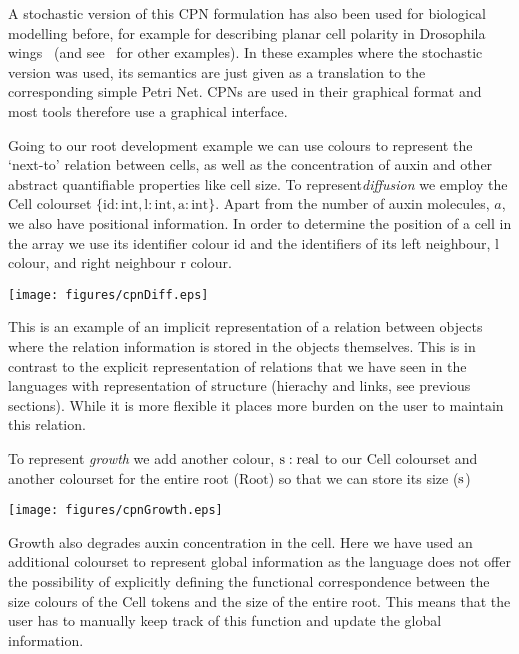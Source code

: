 \documentclass[phd]{infthesis}
\newcommand{\mr}[1]{\mathrm{#1}}
\begin{document}
A stochastic version of this CPN formulation has also been used for biological
modelling before, for example for describing planar cell polarity in Drosophila
wings~\citep{gao_multiscale_2013} (and see~\citet{runge_application_2004,
gilbert_colouring_2013} for other examples). In these examples where the
stochastic version was used, its semantics are just given as a translation to
the corresponding simple Petri Net. CPNs are used in their graphical format and
most tools therefore use a graphical interface.

Going to our root development example we can use colours to represent the
`next-to' relation between cells, as well as the concentration of auxin and
other abstract quantifiable properties like cell size. To represent\emph{diffusion} we
employ the $\mr{Cell}$ colourset $\{\mr{id}: \mr{int}, \mr{l}:\mr{int},
\mr{a}:\mr{int} \} $. Apart from the number of auxin molecules, $a$, we also have
positional information. In order to determine the position of a cell in the
array we use its identifier colour $\mr{id}$ and the identifiers of its left
neighbour, $\mr{l}$ colour, and right neighbour $\mr{r}$ colour.
\begin{center}
    \texttt{[image: figures/cpnDiff.eps]}
\end{center}
This is an example of an implicit representation of a relation between objects
where the relation information is stored in the objects themselves. This is in
contrast to the explicit representation of relations that we have seen in the
languages with representation of structure (hierachy and links, see
previous sections). While it is more flexible it places more burden on the user
to maintain this relation.

To represent \emph{growth} we add another colour,
$\mr{s}:\rm{real}$ to our $\mr{Cell}$ colourset and another colourset for the
entire root ($\mr{Root}$) so that we can store its size ($\rm{s}$)
\begin{center}
    \texttt{[image: figures/cpnGrowth.eps]}
\end{center}
Growth also degrades auxin concentration in the cell. Here we have used an
additional colourset to represent global information as the language does not
offer the possibility of explicitly defining the functional correspondence
between the size colours of the $\mr{Cell}$ tokens and the size of the entire
root. This means that the user has to manually keep track of this function and
update the global information.
\end{document}

